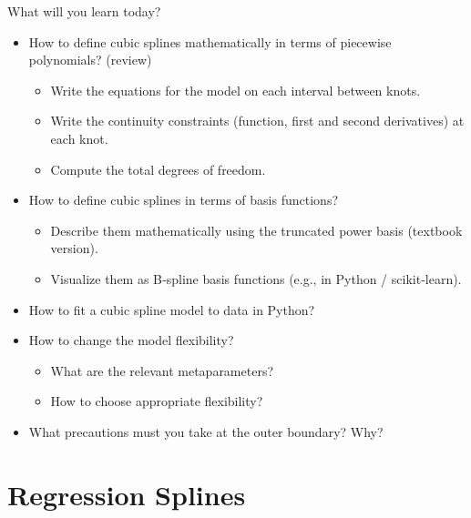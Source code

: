 \documentclass[aspectratio=169,usenames,dvipsnames]{beamer}
\begin{document}
\begin{frame}[t]{What will you learn today?}
\begin{itemize}
	\item How to define cubic splines mathematically in terms of piecewise polynomials? (review)
		\begin{itemize}
			\item Write the equations for the model on each interval between knots.
			\item Write the continuity constraints (function, first and second derivatives) at each knot.
			\item Compute the total degrees of freedom.
		\end{itemize}

	\item How to define cubic splines in terms of basis functions?
		\begin{itemize}
			\item Describe them mathematically using the truncated power basis (textbook version).
			\item Visualize them as B‑spline basis functions (e.g., in Python / scikit‑learn).
		\end{itemize}
	\item How to fit a cubic spline model to data in Python?
	\item How to change the model flexibility?
		\begin{itemize}
			\item What are the relevant metaparameters?
			\item How to choose appropriate flexibility?
		\end{itemize}
	\item What precautions must you take at the outer boundary? Why? 
\end{itemize}

\end{frame}

\section{Regression Splines}
\end{document}
